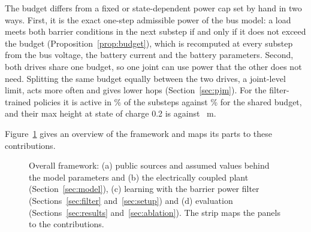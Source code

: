 The budget differs from a fixed or state-dependent power cap set by hand in two ways. First, it is the exact one-step admissible power of the bus model: a load meets both barrier conditions in the next substep if and only if it does not exceed the budget (Proposition~\ref{prop:budget}), which is recomputed at every substep from the bus voltage, the battery current and the battery parameters. Second, both drives share one budget, so one joint can use power that the other does not need. Splitting the same budget equally between the two drives, a joint-level limit, acts more often and gives lower hops (Section~\ref{sec:pjm}). For the filter-trained policies it is active in \% of the substeps against \% for the shared budget, and their max height at state of charge 0.2 is  against ~m.

Figure~\ref{fig:framework} gives an overview of the framework and maps its parts to these contributions.
\begin{figure}[tbp]\centering{}\caption{Overall framework: (a) public sources and assumed values behind the model parameters and (b) the electrically coupled plant (Section~\ref{sec:model}), (c) learning with the barrier power filter (Sections~\ref{sec:filter} and~\ref{sec:setup}) and (d) evaluation (Sections~\ref{sec:results} and~\ref{sec:ablation}). The strip maps the panels to the contributions.}\label{fig:framework}\end{figure}
